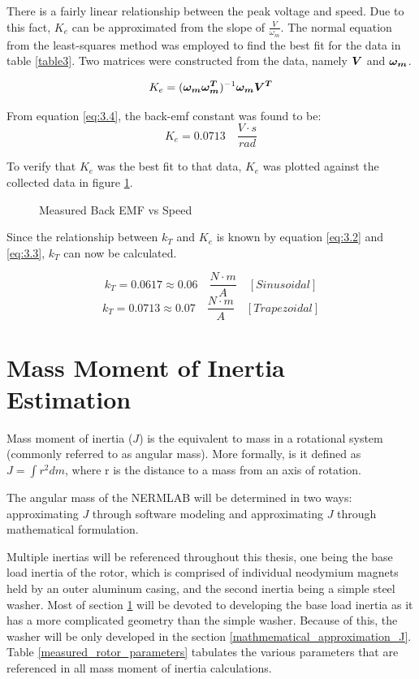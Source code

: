 There is a fairly linear relationship between the peak voltage and speed. Due to this fact, \(K_{e}\) can be approximated from the slope of \(\frac{V}{\omega_m}\). The normal equation from the least-squares method was employed to find the best fit for the data in table \ref{table3}. Two matrices were constructed from the data, namely \(\bm{V}\) and \(\bm{\omega_m}\).

\begin{equation} \label{eq:3.4}
K_{e} = (\bm{\omega_m \omega_m^T})^{-1} \bm{\omega_m V^T}
\end{equation} 

From equation \ref{eq:3.4}, the back-emf constant was found to be: 
\[K_{e} = 0.0713 \quad \frac{V \cdot s}{rad} \]

To verify that \(K_{e}\) was the best fit to that data, \(K_{e}\) was plotted against the collected data in figure \ref{back_emf_plot}.

\begin{figure}[H]
	\centering
		\caption[Measured Back EMF vs Speed]{Measured Back EMF vs Speed}
		\label{back_emf_plot}
		
		
\end{figure}



Since the relationship between \(k_T\) and \(K_{e}\) is known by equation \ref{eq:3.2} and \ref{eq:3.3}, \(k_T\) can now be calculated.
\begin{tcolorbox}[
    standard jigsaw,
    opacityback=0]
\[k_T = 0.0617 \approx 0.06 \quad \frac{N \cdot m}{A} \quad [Sinusoidal]\]
\[k_T =  0.0713 \approx 0.07 \quad  \frac{N \cdot m}{A} \quad [Trapezoidal]\]
\end{tcolorbox}

\newpage
\section{Mass Moment of Inertia Estimation}
\label{mass_moment_of_inertia_estimation}
Mass moment of inertia (\(J\)) is the equivalent to mass in a rotational system (commonly referred to as angular mass). More formally, is it defined as \(J = \int r^2 dm\), where r is the distance to a mass from an axis of rotation.

The angular mass of the NERMLAB will be determined in two ways: approximating \(J\) through software modeling and approximating \(J\) through mathematical formulation. 

Multiple inertias will be referenced throughout this thesis, one being the base load inertia of the rotor, which is comprised of individual neodymium magnets held by an outer aluminum casing, and the second inertia being a simple steel washer. Most of section \ref{mass_moment_of_inertia_estimation} will be devoted to developing the base load inertia as it has a more complicated geometry than the simple washer. Because of this, the washer will be only developed in the section \ref{mathmematical_approximation_J}. Table \ref{measured_rotor_parameters} tabulates the various parameters that are referenced in all mass moment of inertia calculations.

